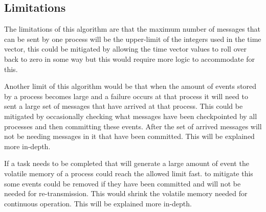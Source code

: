 \documentclass[twocolumn, a4paper,11pt]{article}%
\begin{document}
\subsection{Limitations}
\par The limitations of this algorithm are that the maximum number of messages that can be sent by one process will be the upper-limit of the integers used in the time vector, this could be mitigated by allowing the time vector values to roll over back to zero in some way but this would require more logic to accommodate for this.  
\par Another limit of this algorithm would be that when the amount of events stored by a process becomes large and a failure occurs at that process it will need to sent a large set of messages that have arrived at that process.  This could be mitigated by occasionally checking what messages have been checkpointed by all processes and then committing these events.  After the set of arrived messages will not be needing messages in it that have been committed. This will be explained more in-depth.
\par If a task needs to be completed that will generate a large amount of event the volatile memory of a process could reach the allowed limit fast. to mitigate this some events could be removed if they have been committed and will not be needed for re-transmission. This would shrink the volatile memory needed for continuous operation. This will be explained more in-depth.
\end{document}
